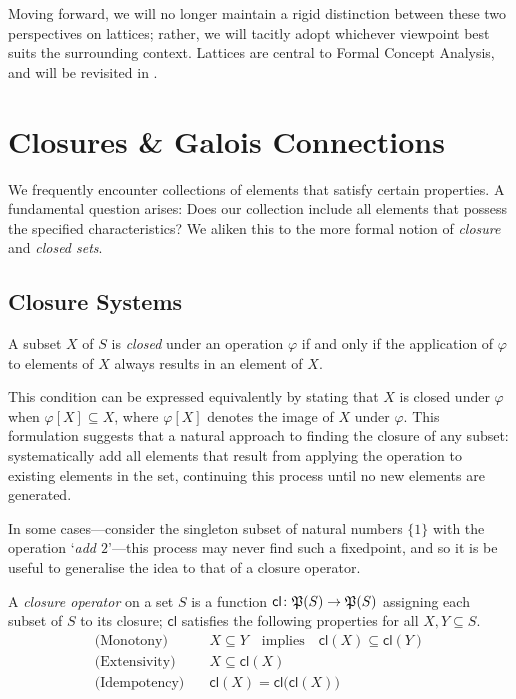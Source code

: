 Moving forward, we will no longer maintain a rigid distinction between these two perspectives on lattices; rather, we will tacitly adopt whichever viewpoint best suits the surrounding context. Lattices
are central to Formal Concept Analysis, and will be revisited in .

\section{Closures \& Galois Connections}
\label{section:closure-systems}

We frequently encounter collections of elements that satisfy certain properties. A fundamental question arises: Does our collection include all elements that possess the specified characteristics? We
aliken this to the more formal notion of \textit{closure} and \textit{closed sets}.

\subsection{Closure Systems}

\begin{definition}
   \label{definition:closed-set} A subset $X$ of $S$ is \textit{closed} under an operation $\varphi$ if and only if the application of $\varphi$ to elements of $X$ always results in
  an element of $X$.
\end{definition}

This condition can be expressed equivalently by stating that $X$ is closed under $\varphi$ when $\varphi [X] \subseteq X$, where $\varphi[X]$ denotes the image of $X$ under $\varphi$. This formulation
suggests that a natural approach to finding the closure of any subset: systematically add all elements that result from applying the operation to existing elements in the set, continuing this process
until no new elements are generated.

In some cases---consider the singleton subset of natural numbers $\{1\}$ with the operation `\textit{add $2$}'---this process may never find such a fixedpoint, and so it is be useful to generalise the
idea to that of a closure operator.

\begin{definition}
   \label{definition:closure-operator} A \emph{closure operator} on a set $S$ is a function $\mathsf{cl}\colon \mathfrak{P}({S})\to \mathfrak{P}({S})$ assigning each subset of $S$ to its closure;
  $\mathsf{cl}$ satisfies the following properties for all $X,Y \subseteq S$.
  \begin{align}
    \text{(Monotony)}\quad    & X \subseteq Y\quad \text{implies}\quad\mathsf{cl}(X) \subseteq \mathsf{cl}(Y) \\
    \text{(Extensivity)}\quad & X \subseteq \mathsf{cl}(X)                                                    \\
    \text{(Idempotency)}\quad & \mathsf{cl}(X) = \mathsf{cl}\big(\mathsf{cl}(X)\big)
  \end{align}
\end{definition}

